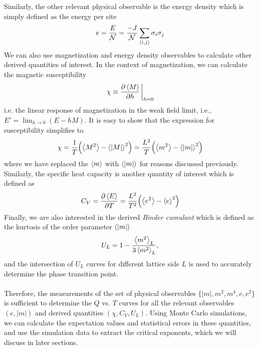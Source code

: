 \documentclass[../thesis_main.tex]{subfiles}
\begin{document}
Similarly, the other relevant physical observable is the energy density which is simply defined as the energy per site
\begin{equation}
    e = \frac{E}{\mathcal{N}} = \frac{-J}{\mathcal{N}} \sum_{\expval{i,j}} \sigma_i \sigma_j
\end{equation}  
We can also use magnetization and energy density observables to calculate other derived quantities of interest. In the context of magnetization, we can calculate the magnetic susceptibility 
\begin{equation}
    \chi \equiv \pdv{\expval{M}}{h}\eval_{h=0}
\end{equation}
i.e. the linear response of magnetization in the weak field limit, i.e.,  $\displaystyle E' = \lim_{h \to 0} (E - hM)$. It is easy to show that the expression for susceptibility simplifies to
\begin{equation}
    \chi = \frac{1}{T}\qty(\expval{M^2} - \expval{|M|}^2) = \frac{L^2}{T}\qty(\expval{m^2} - \expval{|m|}^2)
\end{equation}
where we have replaced the $\expval{m}$ with $\expval{|m|}$ for reasons discussed previously. Similarly, the specific heat capacity is another quantity of interest which is defined as 
\begin{equation}
    C_V = \pdv{\expval{E}}{T} = \frac{L^2}{T^2} \qty(\expval{e^2} - \expval{e}^2)
\end{equation}
Finally, we are also interested in the derived \textit{Binder cumulant} which is defined as the kurtosis of the order parameter $\expval{|m|}$
\begin{equation}
    U_L = 1 - \frac{\expval{m^2}_L}{3\expval{m^2}_L},
\end{equation} 
and the intersection of $U_L$ curves for different lattice side $L$ is used to accurately determine the phase transition point.~\\~\\
Therefore, the measurements of the set of physical observables $\{|m|, m^2, m^4, e, e^2\}$ is sufficient to determine the $Q$ vs. $T$ curves for all the relevant observables $(e, |m|)$  and derived quantities $(\chi, C_V, U_L)$. Using Monte Carlo simulations, we can calculate the expectation values and statistical errors in these quantities, and use the simulation data to extract the critical exponents, which we will discuss in later sections.
\end{document}
